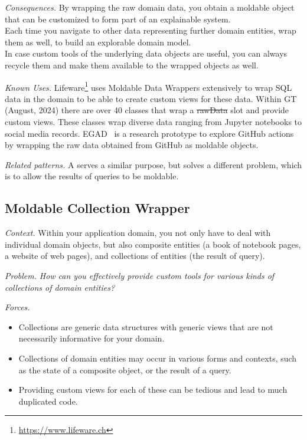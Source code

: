 \documentclass[acmsmall,screen,authorversion,nonacm]{acmart} %
\newcommand{\pattern}[2]{\needlines{10}
\subsection*{#1}\label{pat:#2}}
\newcommand{\patref}[1]{\emph{\nameref{pat:#1}}\xspace}
\newcommand{\patsec}[1]{\noindent\textit{#1.}\xspace}
\begin{document}
\patsec{Consequences}
By wrapping the raw domain data, you obtain a moldable object that can be customized to form part of an explainable system.\\
Each time you navigate to other data representing further domain entities, wrap them as well, to build an explorable domain model.\\
In case custom tools of the underlying data objects are useful, you can always recycle them and make them available to the wrapped objects as well.

\patsec{Known Uses}
Lifeware\footnote{\url{https://www.lifeware.ch}} uses Moldable Data Wrappers extensively to wrap SQL data in the  domain to be able to create custom views for these data.
Within GT (August, 2024) there are over 40 classes that wrap a \st{rawData} slot and provide custom views.
These classes wrap diverse data ranging from Jupyter notebooks to social media records.
EGAD~\cite{Vale23a} is a research prototype to explore GitHub actions by wrapping the raw data obtained from GitHub as moldable objects.

\patsec{Related patterns}
A \patref{CollectionWrapper} serves a similar purpose, but solves a different problem, which is to allow the results of queries to be moldable.

\pattern{Moldable Collection Wrapper}{CollectionWrapper}

\patsec{Context}
Within your application domain, you not only have to deal with individual domain objects, but also composite entities (\eg a book of notebook pages, a website of web pages), and collections of entities (\eg the result of query).

\patsec{Problem}
\emph{How can you effectively provide custom tools for various kinds of collections of domain entities?}

\patsec{Forces}
\begin{itemize}[---]
\item Collections are generic data structures with generic views that are not necessarily informative for your domain.
\item Collections of domain entities may occur in various forms and contexts, such as the state of a composite object, or the result of a query.
\item Providing custom views for each of these can be tedious and lead to much duplicated code.
\end{itemize}
\end{document}
